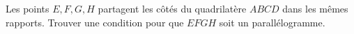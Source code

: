 Les points $E, F, G, H$ partagent les côtés du quadrilatère $ABCD$ dans les mêmes rapports. Trouver une condition pour que $EFGH$ soit un parallélogramme.
